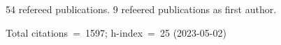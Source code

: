 54 refereed publications. 9 refeered publications as first author.

Total citations~=~1597; h-index~=~25 (2023-05-02)